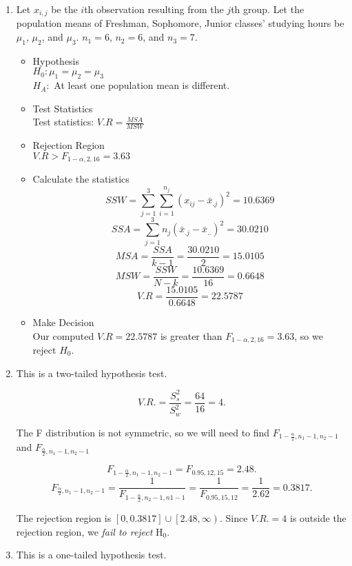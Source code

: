 \begin{enumerate}[Q 1.]
\item 	
\sol
Let $x_{i,j}$ be the $i$th observation resulting from the $j$th group. 
Let the population means of Freshman, Sophomore, Junior classes' studying hours be $\mu_1$, $\mu_2$, and $\mu_3$. $n_1=6$, $n_2=6$, and $n_3=7$.\\

\begin{itemize}
    \item Hypothesis\\
    $H_0: \mu_1=\mu_2=\mu_3$\\
    $H_A:$ At least one population mean is different.\\
    \item Test Statistics\\
    Test statistics: $V.R=\frac{MSA}{MSW}$\\
    \item Rejection Region\\
    $ V.R> F_{1-\alpha,2,16}=3.63$\\
    \item Calculate the statistics\\
    \[SSW=\sum_{j=1}^3\sum_{i=1}^{n_j}(x_{ij}-\bar{x}_{.j})^2=10.6369\]
    \[SSA=\sum_{j=1}^3 n_j(\bar{x}_{.j}-\bar{x}_{..})^2=30.0210\]
    \[MSA=\frac{SSA}{k-1}=\frac{30.0210}{2}=15.0105\]
    \[MSW=\frac{SSW}{N-k}=\frac{10.6369}{16}=0.6648\]
    \[V.R=\frac{15.0105}{0.6648}=22.5787\]
    \item Make Decision \\
    Our computed $V.R= 22.5787$ is greater than $F_{1-\alpha,2,16}=3.63$, so we reject $H_0$.    
\end{itemize}
\item
\sol This is a two-tailed hypothesis test.

$$V.R. = \frac{S_s^2}{S_w^2} = \frac{64}{16} = 4.$$

The F distribution is not symmetric, so we will need to find $F_{1-\frac{\alpha}{2},n_1-1,n_2-1}$ 
and $F_{\frac{\alpha}{2},n_1-1,n_2-1}$

$$F_{1-\frac{\alpha}{2},n_1-1,n_2-1}=F_{0.95, 12, 15}=2.48.$$
$$F_{\frac{\alpha}{2},n_1-1,n_2-1}=\frac{1}{F_{1-\frac{\alpha}{2},n_2-1,n1-1}}=\frac{1}{F_{0.95, 15, 12}}=\frac{1}{2.62} = 0.3817.$$

The rejection region is $\left[0, 0.3817\right] \cup \left[2.48, \infty\right)$. 
Since $V.R.=4$ is outside the rejection region, we \emph{fail to reject} H$_0$.
\item 
\sol This is a one-tailed hypothesis test.


\end{enumerate}
